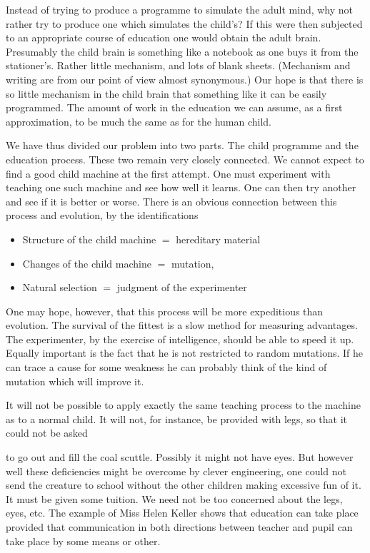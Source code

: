 \documentclass{article}
\begin{document}
Instead of trying to produce a programme to simulate the adult mind, why not rather try to produce one which simulates the child's? If this were then subjected to an appropriate course of education one would obtain the adult brain. Presumably the child brain is something like a notebook as one buys it from the stationer's. Rather little mechanism, and lots of blank sheets. (Mechanism and writing are from our point of view almost synonymous.) Our hope is that there is so little mechanism in the child brain that something like it can be easily programmed. The amount of work in the education we can assume, as a first approximation, to be much the same as for the human child.

We have thus divided our problem into two parts. The child programme and the education process. These two remain very closely connected. We cannot expect to find a good child machine at the first attempt. One must experiment with teaching one such machine and see how well it learns. One can then try another and see if it is better or worse. There is an obvious connection between this process and evolution, by the identifications


\begin{itemize}
\item Structure of the child machine $=$ hereditary material

\item Changes of the child machine $=$ mutation,

\item Natural selection $=$ judgment of the experimenter\end{itemize}

One may hope, however, that this process will be more expeditious than evolution. The survival of the fittest is a slow method for measuring advantages. The experimenter, by the exercise of intelligence, should be able to speed it up. Equally important is the fact that he is not restricted to random mutations. If he can trace a cause for some weakness he can probably think of the kind of mutation which will improve it.

It will not be possible to apply exactly the same teaching process to the machine as to a normal child. It will not, for instance, be provided with legs, so that it could not be asked

to go out and fill the coal scuttle. Possibly it might not have eyes. But however well these deficiencies might be overcome by clever engineering, one could not send the creature to school without the other children making excessive fun of it. It must be given some tuition. We need not be too concerned about the legs, eyes, etc. The example of Miss Helen Keller shows that education can take place provided that communication in both directions between teacher and pupil can take place by some means or other.
\end{document}

